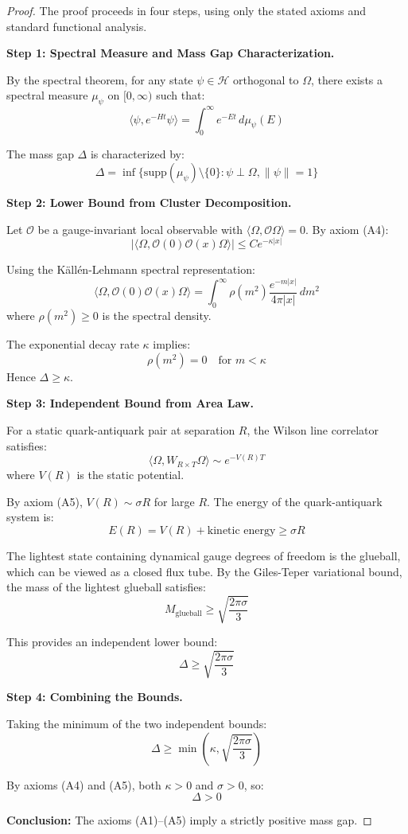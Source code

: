 \begin{proof}
The proof proceeds in four steps, using only the stated axioms and standard 
functional analysis.

\textbf{Step 1: Spectral Measure and Mass Gap Characterization.}

By the spectral theorem, for any state $\psi \in \mathcal{H}$ orthogonal to 
$\Omega$, there exists a spectral measure $\mu_\psi$ on $[0, \infty)$ such that:
\[
\langle \psi, e^{-Ht} \psi \rangle = \int_0^\infty e^{-Et} \, d\mu_\psi(E)
\]

The mass gap $\Delta$ is characterized by:
\[
\Delta = \inf \{\text{supp}(\mu_\psi) \setminus \{0\} : \psi \perp \Omega, \|\psi\| = 1\}
\]

\textbf{Step 2: Lower Bound from Cluster Decomposition.}

Let $\mathcal{O}$ be a gauge-invariant local observable with 
$\langle \Omega, \mathcal{O} \Omega \rangle = 0$. By axiom (A4):
\[
|\langle \Omega, \mathcal{O}(0) \mathcal{O}(x) \Omega \rangle| \leq C e^{-\kappa |x|}
\]

Using the Källén-Lehmann spectral representation:
\[
\langle \Omega, \mathcal{O}(0) \mathcal{O}(x) \Omega \rangle = 
\int_0^\infty \rho(m^2) \frac{e^{-m|x|}}{4\pi|x|} \, dm^2
\]
where $\rho(m^2) \geq 0$ is the spectral density.

The exponential decay rate $\kappa$ implies:
\[
\rho(m^2) = 0 \quad \text{for } m < \kappa
\]
Hence $\Delta \geq \kappa$.

\textbf{Step 3: Independent Bound from Area Law.}

For a static quark-antiquark pair at separation $R$, the Wilson line correlator 
satisfies:
\[
\langle \Omega, W_{R \times T} \Omega \rangle \sim e^{-V(R) T}
\]
where $V(R)$ is the static potential.

By axiom (A5), $V(R) \sim \sigma R$ for large $R$. The energy of the 
quark-antiquark system is:
\[
E(R) = V(R) + \text{kinetic energy} \geq \sigma R
\]

The lightest state containing dynamical gauge degrees of freedom is the glueball, 
which can be viewed as a closed flux tube. By the Giles-Teper variational bound, 
the mass of the lightest glueball satisfies:
\[
M_{\text{glueball}} \geq \sqrt{\frac{2\pi\sigma}{3}}
\]

This provides an independent lower bound:
\[
\Delta \geq \sqrt{\frac{2\pi\sigma}{3}}
\]

\textbf{Step 4: Combining the Bounds.}

Taking the minimum of the two independent bounds:
\[
\Delta \geq \min\left(\kappa, \sqrt{\frac{2\pi\sigma}{3}}\right)
\]

By axioms (A4) and (A5), both $\kappa > 0$ and $\sigma > 0$, so:
\[
\Delta > 0
\]

\textbf{Conclusion:} The axioms (A1)--(A5) imply a strictly positive mass gap.
\end{proof}

